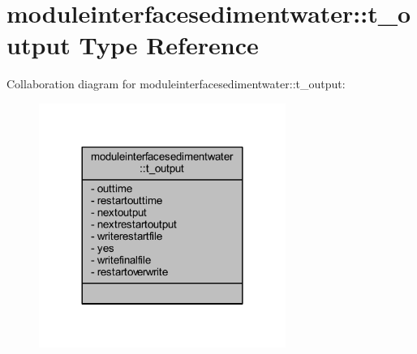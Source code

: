 \hypertarget{structmoduleinterfacesedimentwater_1_1t__output}{}\section{moduleinterfacesedimentwater\+:\+:t\+\_\+output Type Reference}
\label{structmoduleinterfacesedimentwater_1_1t__output}


Collaboration diagram for moduleinterfacesedimentwater\+:\+:t\+\_\+output\+:\nopagebreak
\begin{figure}[H]
\begin{center}
\leavevmode
\includegraphics[width=228pt]{structmoduleinterfacesedimentwater_1_1t__output__coll__graph}
\end{center}
\end{figure}
